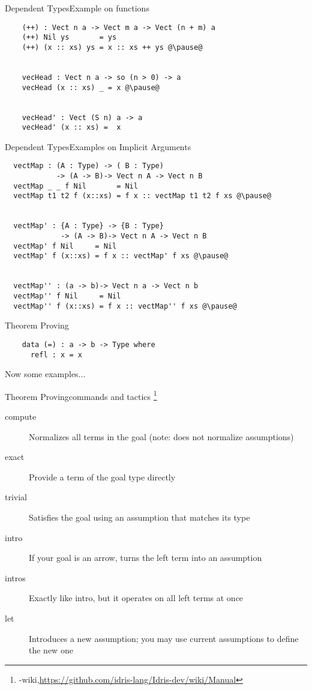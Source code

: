 \documentclass[rail]{beamer}
\begin{document}
\begin{frame}[fragile]{Dependent Types}{Example on functions}
  \begin{lstlisting}
    (++) : Vect n a -> Vect m a -> Vect (n + m) a
    (++) Nil ys       = ys
    (++) (x :: xs) ys = x :: xs ++ ys @\pause@


    vecHead : Vect n a -> so (n > 0) -> a
    vecHead (x :: xs) _ = x @\pause@


    vecHead' : Vect (S n) a -> a
    vecHead' (x :: xs) =  x
  \end{lstlisting}
\end{frame}

\begin{frame}[fragile]{Dependent Types}{Examples on Implicit Arguments}
  \begin{lstlisting}
  vectMap : (A : Type) -> ( B : Type)
            -> (A -> B)-> Vect n A -> Vect n B
  vectMap _ _ f Nil       = Nil
  vectMap t1 t2 f (x::xs) = f x :: vectMap t1 t2 f xs @\pause@


  vectMap' : {A : Type} -> {B : Type}
             -> (A -> B)-> Vect n A -> Vect n B
  vectMap' f Nil     = Nil
  vectMap' f (x::xs) = f x :: vectMap' f xs @\pause@


  vectMap'' : (a -> b)-> Vect n a -> Vect n b
  vectMap'' f Nil     = Nil
  vectMap'' f (x::xs) = f x :: vectMap'' f xs @\pause@
  \end{lstlisting}
\end{frame}

\begin{frame}[fragile]{Theorem Proving}
  \begin{lstlisting}
    data (=) : a -> b -> Type where
      refl : x = x
  \end{lstlisting}
  \pause
  Now some examples...
\end{frame}
\begin{frame}{Theorem Proving}{commands and tactics
    \footnote[frame,1]
    {\idris-wiki,\url{https://github.com/idris-lang/Idris-dev/wiki/Manual}}}
  \begin{description}
  \item[compute] Normalizes all terms in the goal (note: does not
    normalize assumptions)
  \item[exact] Provide a term of the goal type directly
  \item[trivial] Satisfies the goal using an assumption that
    matches its type
  \item[intro] If your goal is an arrow, turns the left term into
    an assumption
  \item[intros] Exactly like intro, but it operates on all left
    terms at once
  \item[let] Introduces a new assumption; you may use current
    assumptions to define the new one
  \end{description}
\end{frame}
\end{document}
